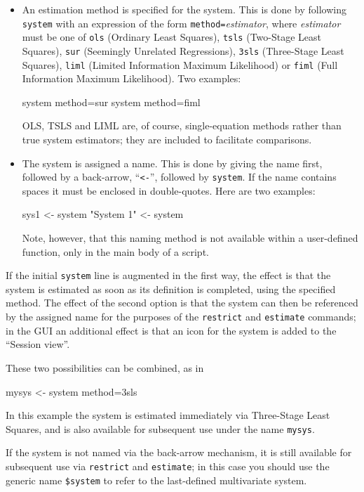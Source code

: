 \begin{itemize}
\item An estimation method is specified for the system. This is done
  by following \texttt{system} with an expression of the form
  \texttt{method=}\textsl{estimator}, where \textsl{estimator} must be
  one of \texttt{ols} (Ordinary Least Squares), \texttt{tsls}
  (Two-Stage Least Squares), \texttt{sur} (Seemingly Unrelated
  Regressions), \texttt{3sls} (Three-Stage Least Squares),
  \texttt{liml} (Limited Information Maximum Likelihood) or
  \texttt{fiml} (Full Information Maximum Likelihood). Two examples:
\begin{code}
system method=sur
system method=fiml
\end{code}
OLS, TSLS and LIML are, of course, single-equation methods rather than
true system estimators; they are included to facilitate comparisons.
\item The system is assigned a name. This is done by giving the name
  first, followed by a back-arrow, ``\verb|<-|'', followed by
  \texttt{system}.  If the name contains spaces it must be enclosed in
  double-quotes. Here are two examples:
\begin{code}
sys1 <- system
"System 1" <- system
\end{code}
Note, however, that this naming method is not available within a
user-defined function, only in the main body of a  script.
\end{itemize}

If the initial \texttt{system} line is augmented in the first way, the
effect is that the system is estimated as soon as its definition is
completed, using the specified method. The effect of the second option
is that the system can then be referenced by the assigned name for the
purposes of the \texttt{restrict} and \texttt{estimate} commands; in
the  GUI an additional effect is that an icon for the
system is added to the ``Session view''.

These two possibilities can be combined, as in
\begin{code}
mysys <- system method=3sls
\end{code}
In this example the system is estimated immediately via Three-Stage
Least Squares, and is also available for subsequent use under the
name \texttt{mysys}.

If the system is not named via the back-arrow mechanism, it is still
available for subsequent use via \texttt{restrict} and
\texttt{estimate}; in this case you should use the generic name
\verb|$system| to refer to the last-defined multivariate system.

